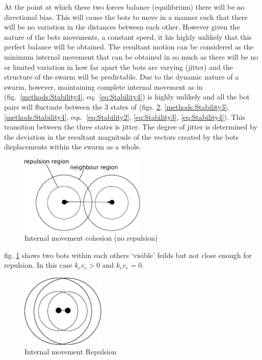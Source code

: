 \documentclass[10pt,journal,letterpaper,twoside]{IEEEtran}
\newcommand{\stability}{internal movement}
\newcommand{\Stability}{Internal movement}
\newcommand{\Fig}{fig.}
\newcommand{\Figs}{figs.}
\newcommand{\Eq}{eq.}
\newcommand{\Eqs}{eqs.}
\begin{document}
At the point at which these two forces balance (equilibrium) there will be no directional bias. This will cause the bots to move in a manner such that there will be no variation in the distances between each other. However given the nature of the bots movements, a constant speed, it his highly unlikely that this perfect balance will be obtained. The resultant motion can be considered as the minimum \stability{} that can be obtained in so much as there will be no or limited variation in how far apart the bots are varying (jitter) and the structure of the swarm will be predictable. Due to the dynamic nature of a swarm, however, maintaining complete \stability{} as in (\Fig{}~\ref{methods:Stability4}, \Eq{}~\ref{eq:Stability4}) is highly unlikely and all the bot pairs will fluctuate between the 3 states of (\Figs{} \ref{methods:Stability2}, \ref{methods:Stability3}, \ref{methods:Stability4}, \Eqs{}~\ref{eq:Stability2}, \ref{eq:Stability3}, \ref{eq:Stability4}).
This transition between the three states is jitter. The degree of jitter is determined by the deviation in the resultant magnitude of the vectors created by the bots displacements within the swarm as a whole.

\begin{figure}[H]
\begin{center}
\includegraphics[width=6cm]{figures/Stability1}
\end{center}
\caption{\Stability{} cohesion (no repulsion)} \label{methods:Stability1}
\end{figure}

\Fig{} \ref{methods:Stability1} shows two bots within each others `visible' feilds but not close enough for repulsion.
In this case $k_cv_c > 0$ and $k_rv_r = 0$.

\begin{figure}[H]
\begin{center}
\includegraphics[width=4cm]{figures/Stability2}
\end{center}
\caption{\Stability{} Repulsion} \label{methods:Stability2}
\end{figure}
\end{document}
